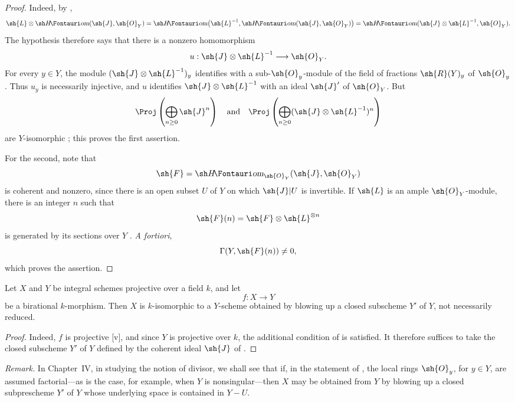 \begin{proof}
Indeed, by ,
\[
  \sh{L}\otimes\shHom(\sh{J},\sh{O}_Y)
  =\shHom\bigl(\sh{L}^{-1},\shHom(\sh{J},\sh{O}_Y)\bigr)
  =\shHom(\sh{J}\otimes\sh{L}^{-1},\sh{O}_Y).
\]
The hypothesis therefore says that there is a nonzero homomorphism
\[
  u:\sh{J}\otimes\sh{L}^{-1}\longrightarrow\sh{O}_Y.
\]
For every $y\in Y$, the module $(\sh{J}\otimes\sh{L}^{-1})_y$ identifies with a sub-$\sh{O}_y$-module of the field of fractions $\sh{R}(Y)_y$ of $\sh{O}_y$ .
Thus $u_y$ is necessarily injective, and $u$ identifies $\sh{J}\otimes\sh{L}^{-1}$ with an ideal $\sh{J}'$ of $\sh{O}_Y$.
But
\[
  \Proj\left(\bigoplus_{n\geq0}\sh{J}^n\right)
  \quad\text{and}\quad
  \Proj\left(\bigoplus_{n\geq0}
  (\sh{J}\otimes\sh{L}^{-1})^n\right)
\]
are $Y$-isomorphic ; this proves the first assertion.

For the second, note that
\[
  \sh{F}=\shHom_{\sh{O}_Y}(\sh{J},\sh{O}_Y)
\]
is coherent and nonzero, since there is an open subset $U$ of $Y$ on which $\sh{J}|U$ is invertible.
If $\sh{L}$ is an ample $\sh{O}_Y$-module, there is an integer $n$ such that
\[
  \sh{F}(n)=\sh{F}\otimes\sh{L}^{\otimes n}
\]
is generated by its sections over $Y$ .
\emph{A fortiori},
\[
  \Gamma(Y,\sh{F}(n))\neq0,
\]
which proves the assertion.
\end{proof}

\begin{corollary}[2.3.7]
\label{III.2.3.7}
Let $X$ and $Y$ be integral schemes projective over a field $k$, and let
\[
  f:X\longrightarrow Y
\]
be a birational $k$-morphism.
Then $X$ is $k$-isomorphic to a $Y$-scheme obtained by blowing up a closed subscheme $Y'$ of $Y$, not necessarily reduced.
\end{corollary}

\begin{proof}
Indeed, $f$ is projective [v], and since $Y$ is projective over $k$, the additional condition of  is satisfied.
It therefore suffices to take the closed subscheme $Y'$ of $Y$ defined by the coherent ideal $\sh{J}$ of .
\end{proof}

\begin{env}[2.3.8]
\label{III.2.3.8}
\emph{Remark.}
In Chapter~IV, in studying the notion of divisor, we shall see that if, in the statement of , the local rings $\sh{O}_y$, for $y\in Y$, are assumed factorial---as is the case, for example, when $Y$ is nonsingular---then $X$ may be obtained from $Y$ by blowing up a closed subprescheme $Y'$ of $Y$ whose underlying space is contained in $Y-U$.
\end{env}


